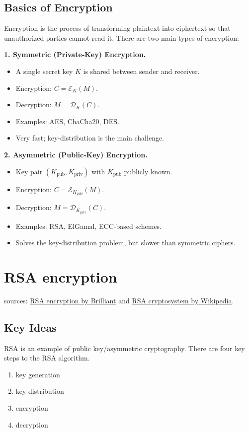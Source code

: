 \documentclass[12pt,a4paper]{report}
\begin{document}
\section{Basics of Encryption}
Encryption is the process of transforming plaintext into ciphertext so that unauthorized parties cannot read it.  There are two main types of encryption:

\medskip
\noindent\textbf{1. Symmetric (Private‐Key) Encryption.}  
\begin{itemize}
  \item A single secret key \(K\) is shared between sender and receiver.
  \item Encryption: \(C = \mathcal{E}_K(M)\).  
  \item Decryption: \(M = \mathcal{D}_K(C)\).  
  \item Examples: AES, ChaCha20, DES.
  \item Very fast; key‐distribution is the main challenge.
\end{itemize}

\medskip
\noindent\textbf{2. Asymmetric (Public‐Key) Encryption.}  
\begin{itemize}
  \item Key pair \((K_{\text{pub}},K_{\text{priv}})\) with \(K_{\text{pub}}\) publicly known.
  \item Encryption: \(C = \mathcal{E}_{K_{\text{pub}}}(M)\).
  \item Decryption: \(M = \mathcal{D}_{K_{\text{priv}}}(C)\).
  \item Examples: RSA, ElGamal, ECC‐based schemes.
  \item Solves the key‐distribution problem, but slower than symmetric ciphers.
\end{itemize}
\chapter{RSA encryption}
sources: \href{https://brilliant.org/wiki/rsa-encryption/}{RSA encryption by Brilliant} and \href{https://en.wikipedia.org/wiki/RSA_cryptosystem#Padding_schemes}{RSA cryptosystem by Wikipedia}.
\section{Key Ideas}
RSA is an example of public key/asymmetric cryptography. There are four key steps to the RSA algorithm.
\begin{enumerate}
    \item key generation
    \item key distribution
    \item encryption
    \item decryption
\end{enumerate}
\end{document}
